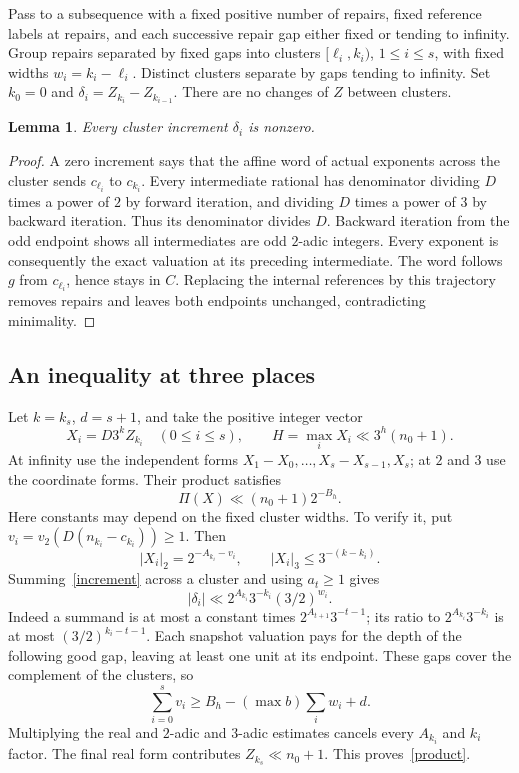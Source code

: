 \documentclass[11pt]{article}
\newtheorem{lemma}[theorem]{Lemma}
\begin{document}
Pass to a subsequence with a fixed positive number of repairs, fixed reference labels at repairs, and each successive repair gap either fixed or tending to infinity. Group repairs separated by fixed gaps into clusters
$[\ell_i,k_i)$, $1\le i\le s$, with fixed widths $w_i=k_i-\ell_i$. Distinct clusters separate by gaps tending to infinity. Set $k_0=0$ and
$\delta_i=Z_{k_i}-Z_{k_{i-1}}$.
There are no changes of $Z$ between clusters.

\begin{lemma}\label{nonzero}
Every cluster increment $\delta_i$ is nonzero.
\end{lemma}
\begin{proof}
A zero increment says that the affine word of actual exponents across the cluster sends $c_{\ell_i}$ to $c_{k_i}$. Every intermediate rational has denominator dividing $D$ times a power of $2$ by forward iteration, and dividing $D$ times a power of $3$ by backward iteration. Thus its denominator divides $D$.
Backward iteration from the odd endpoint shows all intermediates are odd $2$-adic integers. Every exponent is consequently the exact valuation at its preceding intermediate. The word follows $g$ from $c_{\ell_i}$, hence stays in $C$. Replacing the internal references by this trajectory removes repairs and leaves both endpoints unchanged, contradicting minimality.
\end{proof}

\subsection{An inequality at three places}
Let $k=k_s$, $d=s+1$, and take the positive integer vector
\[
X_i=D3^kZ_{k_i}\quad(0\le i\le s),\qquad
H=\max_iX_i\ll3^h(n_0+1).
\]
At infinity use the independent forms
$X_1-X_0,\ldots,X_s-X_{s-1},X_s$; at $2$ and $3$ use the coordinate forms. Their product satisfies
\begin{equation}\label{product}
\Pi(X)\ll(n_0+1)2^{-B_h}.
\end{equation}
Here constants may depend on the fixed cluster widths. To verify it, put
$v_i=v_2(D(n_{k_i}-c_{k_i}))\ge1$. Then
\[
|X_i|_2=2^{-A_{k_i}-v_i},\qquad
|X_i|_3\le3^{-(k-k_i)}.
\]
Summing~\eqref{increment} across a cluster and using $a_t\ge1$ gives
\[
|\delta_i|\ll 2^{A_{k_i}}3^{-k_i}(3/2)^{w_i}.
\]
Indeed a summand is at most a constant times $2^{A_{t+1}}3^{-t-1}$; its ratio to $2^{A_{k_i}}3^{-k_i}$ is at most $(3/2)^{k_i-t-1}$.
Each snapshot valuation pays for the depth of the following good gap, leaving at least one unit at its endpoint. These gaps cover the complement of the clusters, so
\[
\sum_{i=0}^s v_i\ge B_h-(\max b)\sum_iw_i+d.
\]
Multiplying the real and $2$-adic and $3$-adic estimates cancels every $A_{k_i}$ and $k_i$ factor. The final real form contributes $Z_{k_s}\ll n_0+1$. This proves~\eqref{product}.
\end{document}
